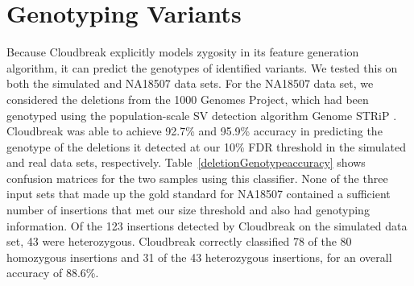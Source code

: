 \section{Genotyping Variants}\label{section_genotyping_eval}

Because Cloudbreak explicitly models zygosity in its feature generation algorithm, it can predict the genotypes of identified variants. We tested this on both the simulated and NA18507 data sets. For the NA18507 data set, we considered the deletions from the 1000 Genomes Project, which had been genotyped using the population-scale SV detection algorithm Genome STRiP \cite{Handsaker:2011ki}. Cloudbreak was able to achieve 92.7\% and 95.9\% accuracy in predicting the genotype of the deletions it detected at our 10\% FDR threshold in the simulated and real data sets, respectively. Table~\ref{deletionGenotypeaccuracy} shows confusion matrices for the two samples using this classifier. None of the three input sets that made up the gold standard for NA18507 contained a sufficient number of insertions that met our size threshold and also had genotyping information. Of the 123 insertions detected by Cloudbreak on the simulated data set, 43 were heterozygous. Cloudbreak correctly classified 78 of the 80 homozygous insertions and 31 of the 43 heterozygous insertions, for an overall accuracy of 88.6\%.

\begin{table}
\begin{center}
\end{center}
\caption[Confusion matrices for the predicted genotype of deletions.]{Confusion matrices for the predicted genotype of deletions found by Cloudbreak on both the simulated and NA18507 data sets.}
\label{deletionGenotypeaccuracy}
\end{table}

